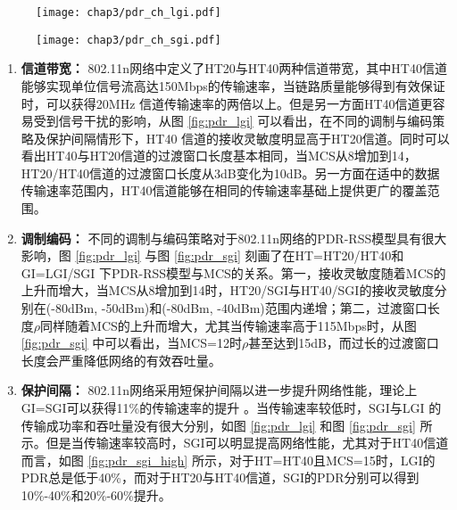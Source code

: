 \begin{figure}[!htp]
\centering
    \texttt{[image: chap3/pdr\_ch\_lgi.pdf]}
\end{figure}

\begin{figure}[!htp]
\centering
    \texttt{[image: chap3/pdr\_ch\_sgi.pdf]}
\end{figure}

\begin{enumerate}
  \item \textbf{信道带宽：}
  802.11n网络中定义了HT20与HT40两种信道带宽，其中HT40信道能够实现单位信号流高达150Mbps的传输速率，当链路质量能够得到有效保证时，可以获得20MHz 信道传输速率的两倍以上。但是另一方面HT40信道更容易受到信号干扰的影响，从图 \ref{fig:pdr_lgi} 可以看出，在不同的调制与编码策略及保护间隔情形下，HT40 信道的接收灵敏度明显高于HT20信道。同时可以看出HT40与HT20信道的过渡窗口长度基本相同，当MCS从8增加到14，HT20/HT40信道的过渡窗口长度从3dB变化为10dB。另一方面在适中的数据传输速率范围内，HT40信道能够在相同的传输速率基础上提供更广的覆盖范围。
  \item \textbf{调制编码：}
  不同的调制与编码策略对于802.11n网络的PDR-RSS模型具有很大影响，图 \ref{fig:pdr_lgi} 与图 \ref{fig:pdr_sgi} 刻画了在HT=HT20/HT40和GI=LGI/SGI 下PDR-RSS模型与MCS的关系。第一，接收灵敏度随着MCS的上升而增大，当MCS从8增加到14时，HT20/SGI与HT40/SGI的接收灵敏度分别在(-80dBm, -50dBm)和(-80dBm, -40dBm)范围内递增；第二，过渡窗口长度$\rho$同样随着MCS的上升而增大，尤其当传输速率高于115Mbps时，从图 \ref{fig:pdr_sgi} 中可以看出，当MCS=12时$\rho$甚至达到15dB，而过长的过渡窗口长度会严重降低网络的有效吞吐量。
  \item \textbf{保护间隔：}
  802.11n网络采用短保护间隔以进一步提升网络性能，理论上GI=SGI可以获得11\%的传输速率的提升 \cite{perahia2008next}。当传输速率较低时，SGI与LGI 的传输成功率和吞吐量没有很大分别，如图 \ref{fig:pdr_lgi} 和图 \ref{fig:pdr_sgi} 所示。但是当传输速率较高时，SGI可以明显提高网络性能，尤其对于HT40信道而言，如图 \ref{fig:pdr_sgi_high} 所示，对于HT=HT40且MCS=15时，LGI的PDR总是低于40\%，而对于HT20与HT40信道，SGI的PDR分别可以得到10\%-40\%和20\%-60\%提升。
\end{enumerate}

